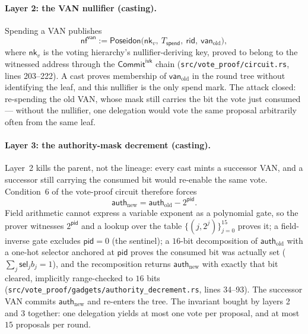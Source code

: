 \documentclass[11pt,a4paper]{article}
\theoremstyle{definition}
\newcommand{\nfsym}{\mathsf{nf}}
\newcommand{\CommitIvk}{\ensuremath{\mathsf{Commit}^{\mathsf{ivk}}}}
\newcommand{\nksym}{\ensuremath{\mathsf{nk}}}
\begin{document}
\paragraph{Layer 2: the VAN nullifier (casting).} Spending a VAN publishes
\[
\nfsym^{\mathsf{van}} := \mathsf{Poseidon}\bigl(\nksym_{v},\
T_{\mathsf{spend}},\ \mathsf{rid},\ \mathsf{van}_{\mathrm{old}}\bigr),
\]
where $\nksym_{v}$ is the voting hierarchy's nullifier-deriving key, proved
to belong to the witnessed address through the \CommitIvk{} chain
(\texttt{src/vote\_proof/circuit.rs}, lines 203--222). A cast proves
membership of $\mathsf{van}_{\mathrm{old}}$ in the round tree without
identifying the leaf, and this nullifier is the only spend mark. The attack
closed: re-spending the old VAN, whose mask still carries the bit the vote
just consumed --- without the nullifier, one delegation would vote the same
proposal arbitrarily often from the same leaf.

\paragraph{Layer 3: the authority-mask decrement (casting).} Layer~2 kills
the parent, not the lineage: every cast mints a successor VAN, and a
successor still carrying the consumed bit would re-enable the same vote.
Condition~6 of the vote-proof circuit therefore forces
\[
\mathsf{auth}_{\mathrm{new}} = \mathsf{auth}_{\mathrm{old}} -
2^{\mathsf{pid}}.
\]
Field arithmetic cannot express a variable exponent as a polynomial gate, so
the prover witnesses $2^{\mathsf{pid}}$ and a lookup over the table
$\{(j, 2^{j})\}_{j=0}^{15}$ proves it; a field-inverse gate excludes
$\mathsf{pid} = 0$ (the sentinel); a $16$-bit decomposition of
$\mathsf{auth}_{\mathrm{old}}$ with a one-hot selector anchored at
$\mathsf{pid}$ proves the consumed bit was actually set ($\sum_j
\mathsf{sel}_j b_j = 1$), and the recomposition returns
$\mathsf{auth}_{\mathrm{new}}$ with exactly that bit cleared, implicitly
range-checked to $16$ bits
(\texttt{src/vote\_proof/gadgets/authority\_decrement.rs}, lines 34--93).
The successor VAN commits $\mathsf{auth}_{\mathrm{new}}$ and re-enters the
tree. The invariant bought by layers 2 and 3 together: one delegation yields
at most one vote per proposal, and at most $15$ proposals per round.
\end{document}

